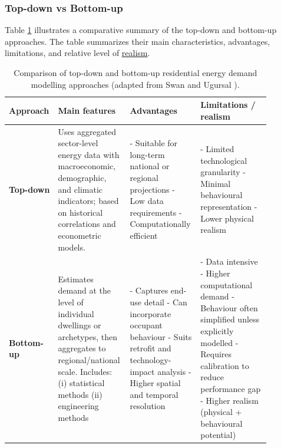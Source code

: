 \subsubsection*{Top-down vs Bottom-up}
Table \ref{tab:model_comparison} illustrates a comparative summary of the top-down and bottom-up approaches. The table summarizes their main characteristics, advantages, limitations, and relative level of \hyperref[sec:realism]{realism}.

\begin{table}[ht]
\centering
\footnotesize
\setlength{\tabcolsep}{4pt}
\renewcommand{\arraystretch}{1.2}
\caption{Comparison of top-down and bottom-up residential energy demand modelling approaches (adapted from Swan and Ugursal \cite{swan_modeling_2009}).}
\label{tab:model_comparison}
\begin{tabular}{>{\raggedright\arraybackslash}p{0.12\linewidth}
                >{\raggedright\arraybackslash}p{0.26\linewidth}
                >{\raggedright\arraybackslash}p{0.24\linewidth}
                >{\raggedright\arraybackslash}p{0.26\linewidth}}
\hline
\textbf{Approach} & \textbf{Main features} & \textbf{Advantages} & \textbf{Limitations / realism} \\
\hline
\textbf{Top-down} &
Uses aggregated sector-level energy data with macroeconomic, demographic, and climatic indicators; based on historical correlations and econometric models. &
- Suitable for long-term national or regional projections \newline
- Low data requirements \newline
- Computationally efficient &
- Limited technological granularity \newline
- Minimal behavioural representation \newline
- Lower physical realism \\
\hline
\textbf{Bottom-up} &
Estimates demand at the level of individual dwellings or archetypes, then aggregates to regional/national scale. Includes: \newline
(i) statistical methods \newline
(ii) engineering methods &
- Captures end-use detail \newline
- Can incorporate occupant behaviour \newline
- Suits retrofit and technology-impact analysis \newline
- Higher spatial and temporal resolution &
- Data intensive \newline
- Higher computational demand \newline
- Behaviour often simplified unless explicitly modelled \newline
- Requires calibration to reduce performance gap \newline
- Higher realism (physical + behavioural potential) \\
\hline
\end{tabular}
\end{table}

